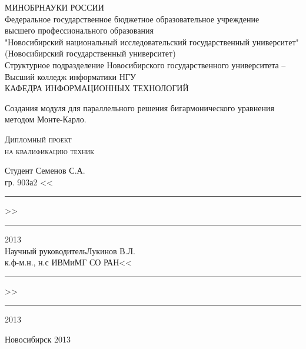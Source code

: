 \begin{titlepage}
\begin{center}
МИНОБРНАУКИ РОССИИ\\
Федеральное государственное бюджетное образовательное учреждение\\
высшего профессионального образования \\
"Новосибирский национальный исследовательский государственный университет"\\
(Новосибирский государственный университет)\\
Структурное подразделение Новосибирского государственного университета -- \\
Высший колледж информатики НГУ\\
КАФЕДРА ИНФОРМАЦИОННЫХ ТЕХНОЛОГИЙ
\end{center}

\vspace{8em}

\begin{center}
\Large Создания модуля для параллельного решения бигармонического уравнения методом Монте-Карло. 
\end{center}

\vspace{2.5em}

\begin{center}
\textsc{Дипломный проект\\ на квалификацию техник }
\end{center}

\vspace{6em}

\begin{flushleft}
 Студент \hfill Семенов С.А. \\
гр. 903а2 \hfill <<\rule{3ex}{0,1mm}>>\rule{10ex}{0,1mm}2013 \\
\vspace{1.5em}
Научный руководитель\hfill Лукинов В.Л.\\
к.ф-м.н., н.с ИВМиМГ СО РАН\hfill <<\rule{3ex}{0,1mm}>>\rule{10ex}{0,1mm}2013 \\
\end{flushleft}

\vspace{\fill}
\begin{center}
Новосибирск 2013
\end{center}
\end{titlepage}
